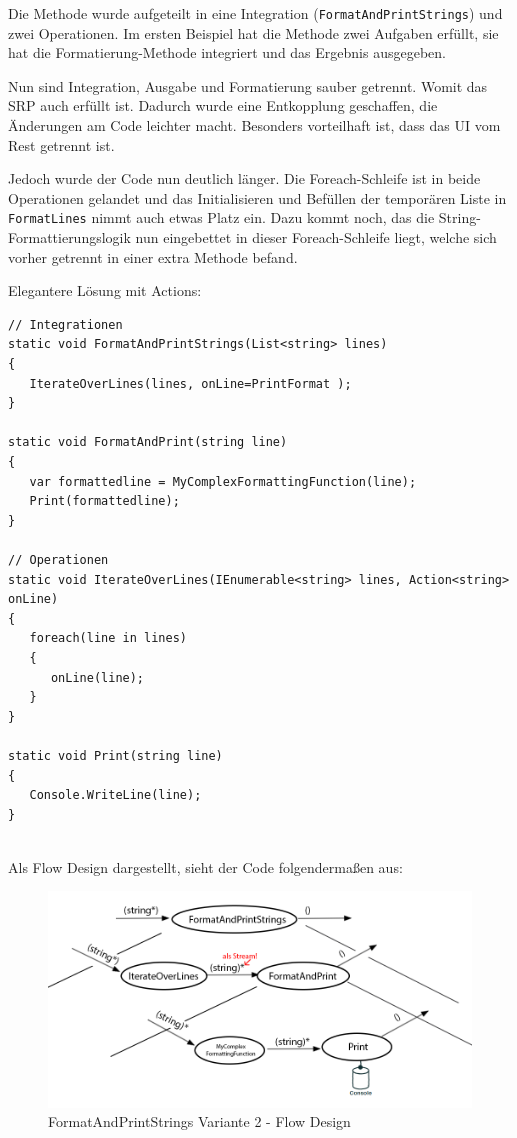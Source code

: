 Die Methode wurde aufgeteilt in eine Integration (\texttt{FormatAndPrintStrings}) und zwei Operationen.
Im ersten Beispiel hat die Methode zwei Aufgaben erfüllt, sie hat die Formatierung-Methode integriert und
das Ergebnis ausgegeben.

Nun sind Integration, Ausgabe und Formatierung sauber getrennt.
Womit das SRP auch erfüllt ist. Dadurch wurde eine Entkopplung geschaffen, 
die Änderungen am Code leichter macht. Besonders vorteilhaft ist, dass das UI vom Rest getrennt ist. 

Jedoch wurde der Code nun deutlich länger. Die Foreach-Schleife ist in beide Operationen gelandet und das Initialisieren und
Befüllen der temporären Liste in \texttt{FormatLines} nimmt auch etwas Platz ein.
Dazu kommt noch, das die String-Formattierungslogik nun eingebettet in dieser Foreach-Schleife liegt, welche sich vorher getrennt in
einer extra Methode  befand.

\bigskip

Elegantere Lösung mit Actions:

\begin{lstlisting}[caption=FormatAndPrintStrings Variante 2]
// Integrationen
static void FormatAndPrintStrings(List<string> lines)
{
   IterateOverLines(lines, onLine=PrintFormat );
}

static void FormatAndPrint(string line)
{
   var formattedline = MyComplexFormattingFunction(line);
   Print(formattedline);
}

// Operationen
static void IterateOverLines(IEnumerable<string> lines, Action<string> onLine)
{
   foreach(line in lines)
   {
      onLine(line);
   }
}

static void Print(string line)
{
   Console.WriteLine(line);
}


\end{lstlisting}

Als Flow Design dargestellt, sieht der Code folgendermaßen aus:

\begin{figure}[H]
	\centering
	\includegraphics[width=1\linewidth]{./img/FlowsForeach.png}
	\caption{FormatAndPrintStrings Variante 2 - Flow Design}
\end{figure}



